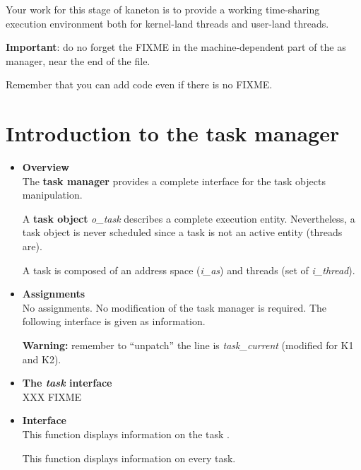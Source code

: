 Your work for this stage of kaneton is to provide a working
time-sharing execution environment both for kernel-land threads and
user-land threads.

\textbf{Important}: do no forget the FIXME in the machine-dependent
part of the as manager, near the end of the file.

Remember that you can add code even if there is no FIXME.


%
%

\newpage

\section{Introduction to the \textbf{task} manager}

\begin{itemize}
  \item {\bf Overview}\\

    The \textbf{task manager} provides a complete interface for the
    task objects manipulation.

    A \textbf{task object} \textit{o\_task} describes a complete
    execution entity. Nevertheless, a task object is never scheduled
    since a task is not an active entity (threads are).

    A task is composed of an address space (\textit{i\_as}) and threads
    (set of \textit{i\_thread}).

  \item {\bf Assignments}\\

    No assignments. No modification of the task manager is
    required. The following interface is given as information.

    \textbf{Warning:} remember to ``unpatch'' the line is
    \emph{task\_current} (modified for K1 and K2).

  \item {\bf The \emph{task} interface}\\
    XXX FIXME

  \item {\bf Interface}\\

	 {
	   This function displays information on the task .
	 }

	 {
	   This function displays information on every task.
	 }


\end{itemize}
